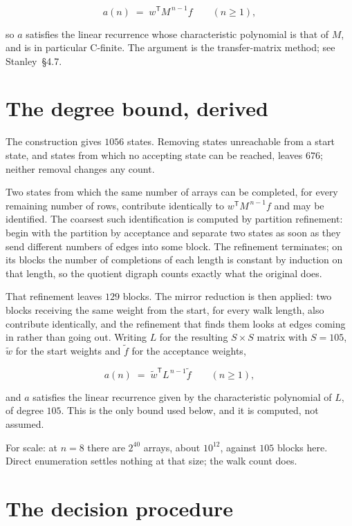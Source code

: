\documentclass[11pt]{article}
\theoremstyle{definition}
\begin{document}
\[a(n) \;=\; w^{\mathsf T} M^{\,n-1} f \qquad (n \ge 1),\]

so $a$ satisfies the linear recurrence whose characteristic polynomial is that of $M$, and is in particular C-finite. The argument is the transfer-matrix method; see Stanley~\S4.7.

\section{The degree bound, derived}

The construction gives $1056$ states. Removing states unreachable from a start state, and states from which no accepting state can be reached, leaves $676$; neither removal changes any count.

Two states from which the same number of arrays can be completed, for every remaining number of rows, contribute identically to $w^{\mathsf T}M^{\,n-1}f$ and may be identified. The coarsest such identification is computed by partition refinement: begin with the partition by acceptance and separate two states as soon as they send different numbers of edges into some block. The refinement terminates; on its blocks the number of completions of each length is constant by induction on that length, so the quotient digraph counts exactly what the original does.

That refinement leaves $129$ blocks. The mirror reduction is then applied: two blocks receiving the same weight from the start, for every walk length, also contribute identically, and the refinement that finds them looks at edges coming in rather than going out. Writing $L$ for the resulting $S \times S$ matrix with $S = 105$, $\tilde w$ for the start weights and $\tilde f$ for the acceptance weights,

\[a(n) \;=\; \tilde w^{\mathsf T} L^{\,n-1} \tilde f \qquad (n \ge 1),\]

and $a$ satisfies the linear recurrence given by the characteristic polynomial of $L$, of degree $105$. This is the only bound used below, and it is computed, not assumed.

For scale: at $n = 8$ there are $2^{40}$ arrays, about $10^{12}$, against $105$ blocks here. Direct enumeration settles nothing at that size; the walk count does.

\section{The decision procedure}
\end{document}
